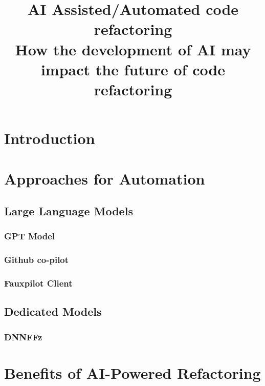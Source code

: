 \documentclass[conference]{IEEEtran}
\begin{document}
\title{AI Assisted/Automated code refactoring\\
{\footnotesize How the development of AI may impact the future of code refactoring}
}

\author{
    \and
}

\maketitle



\section{Introduction}


\section{Approaches for Automation}

\subsection{Large Language Models}
\subsubsection{GPT Model}
\subsubsection{Github co-pilot}
\subsubsection{Fauxpilot Client}

\subsection{Dedicated Models}
\subsubsection{DNNFFz}

\section{Benefits of AI-Powered Refactoring}\label{benefits}
\end{document}
